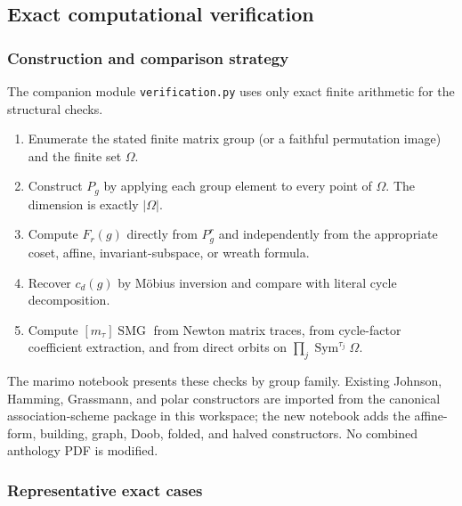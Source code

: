 \documentclass[10pt]{article}
\newcommand{\Sym}{\operatorname{Sym}}
\newcommand{\SMG}{\operatorname{SMG}}
\newcommand{\MGF}{\SMG}
\begin{document}
\subsection{Exact computational verification}

\subsubsection{Construction and comparison strategy}

The companion module \texttt{verification.py} uses only exact finite
arithmetic for the structural checks.
\begin{enumerate}
\item Enumerate the stated finite matrix group (or a faithful permutation
image) and the finite set $\Omega$.
\item Construct $P_g$ by applying each group element to every point of
$\Omega$.  The dimension is exactly $|\Omega|$.
\item Compute $F_r(g)$ directly from $P_g^r$ and independently from the
appropriate coset, affine, invariant-subspace, or wreath formula.
\item Recover $c_d(g)$ by M\"obius inversion and compare with literal cycle
decomposition.\par
\item Compute $[m_\tau]\MGF$ from Newton matrix traces, from cycle-factor
coefficient extraction, and from direct orbits on
$\prod_j\Sym^{\tau_j}\Omega$.
\end{enumerate}

The marimo notebook presents these checks by group family.  Existing Johnson,
Hamming, Grassmann, and polar constructors are imported from the canonical
association-scheme package in this workspace; the new notebook adds the
affine-form, building, graph, Doob, folded, and halved constructors.  No
combined anthology PDF is modified.

\subsubsection{Representative exact cases}
\end{document}
